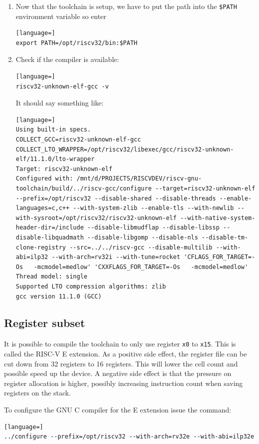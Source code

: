 \documentclass[12pt]{article}
\begin{document}
\begin{enumerate}
\item Now that the toolchain is setup, we have to put the path into the \lstinline|$PATH| environment variable so enter
\begin{lstlisting}[language=]
export PATH=/opt/riscv32/bin:$PATH
\end{lstlisting}
\item Check if the compiler is available:
\begin{lstlisting}[language=]
riscv32-unknown-elf-gcc -v
\end{lstlisting}
It should say something like:
\begin{lstlisting}[language=]
Using built-in specs.
COLLECT_GCC=riscv32-unknown-elf-gcc
COLLECT_LTO_WRAPPER=/opt/riscv32/libexec/gcc/riscv32-unknown-elf/11.1.0/lto-wrapper
Target: riscv32-unknown-elf
Configured with: /mnt/d/PROJECTS/RISCVDEV/riscv-gnu-toolchain/build/../riscv-gcc/configure --target=riscv32-unknown-elf --prefix=/opt/riscv32 --disable-shared --disable-threads --enable-languages=c,c++ --with-system-zlib --enable-tls --with-newlib --with-sysroot=/opt/riscv32/riscv32-unknown-elf --with-native-system-header-dir=/include --disable-libmudflap --disable-libssp --disable-libquadmath --disable-libgomp --disable-nls --disable-tm-clone-registry --src=../../riscv-gcc --disable-multilib --with-abi=ilp32 --with-arch=rv32i --with-tune=rocket 'CFLAGS_FOR_TARGET=-Os   -mcmodel=medlow' 'CXXFLAGS_FOR_TARGET=-Os   -mcmodel=medlow'
Thread model: single
Supported LTO compression algorithms: zlib
gcc version 11.1.0 (GCC) 
\end{lstlisting}
\end{enumerate}

\subsection{Register subset}
It is possible to compile the toolchain to only use register \texttt{x0} to \texttt{x15}. This is called the RISC-V E extension. As a positive side effect, the register file can be cut down from 32 registers to 16 registers. This will lower the cell count and possible speed up the device. A negative side effect is that the pressure on register allocation is higher, possibly increasing instruction count when saving registers on the stack.

To configure the GNU C compiler for the E extension issue the command:

\begin{lstlisting}[language=]
../configure --prefix=/opt/riscv32 --with-arch=rv32e --with-abi=ilp32e
\end{lstlisting}
\end{document}
